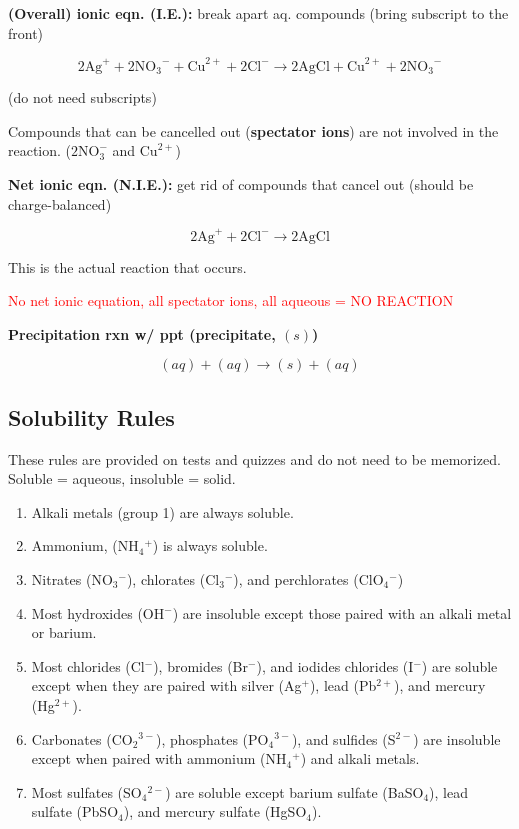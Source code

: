 \documentclass[a4paper, 12pt]{article}
\begin{document}
\textbf{(Overall) ionic eqn. (I.E.):} break apart aq. compounds (bring subscript to the front)

$$2\text{Ag}^+ + 2{\text{NO}_3}^- + \text{Cu}^{2+} + 2\text{Cl}^- \longrightarrow 2\text{AgCl} + \text{Cu}^{2+} + {2\text{NO}_3}^-$$

(do not need subscripts)

Compounds that can be cancelled out (\textbf{spectator ions}) are not involved in the reaction. ($2\text{NO}_3^-$ and $\text{Cu}^{2+}$)

\textbf{Net ionic eqn. (N.I.E.):} get rid of compounds that cancel out (should be charge-balanced)

$$2\text{Ag}^+ + 2\text{Cl}^- \longrightarrow 2\text{AgCl}$$

This is the actual reaction that occurs.

\textcolor{red}{No net ionic equation, all spectator ions, all aqueous = NO REACTION}

\textbf{Precipitation rxn w/ ppt (precipitate, $(s)$)}

$$(aq) + (aq) \longrightarrow (s) + (aq)$$

\subsection*{Solubility Rules} \label{solubility rules}
These rules are provided on tests and quizzes and do not need to be memorized. Soluble = aqueous, insoluble = solid.

\begin{enumerate}[leftmargin=*, nosep]
    \item Alkali metals (group 1) are always soluble.
    \item Ammonium, (NH$_4$$^+$) is always soluble.
    \item Nitrates (NO$_3$$^-$), chlorates (Cl$_3$$^-$), and perchlorates (ClO$_4$$^-$)
    \item Most hydroxides (OH$^-$) are insoluble except those paired with an alkali metal or barium.
    \item Most chlorides (Cl$^-$), bromides (Br$^-$), and iodides chlorides (I$^-$) are soluble except when they are paired with silver (Ag$^+$), lead (Pb$^{2+}$), and mercury (Hg$^{2+}$).
    \item Carbonates (CO$_2$$^{3-}$), phosphates (PO$_4$$^{3-}$), and sulfides (S$^{2-}$) are insoluble except when paired with ammonium (NH$_4$$^+$) and alkali metals.
    \item Most sulfates (SO$_4$$^{2-}$) are soluble except barium sulfate (BaSO$_4$), lead sulfate (PbSO$_4$), and mercury sulfate (HgSO$_4$).
\end{enumerate}
\end{document}
